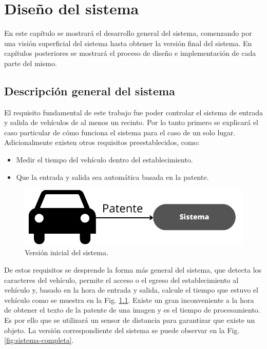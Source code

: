 \chapter{Diseño del sistema}

En este capítulo se mostrará el desarrollo general del sistema, comenzando por una visión superficial del sistema hasta obtener la versión final del sistema. En capítulos posteriores se mostrará el proceso de diseño e implementación de cada parte del mismo.

\section{Descripción general del sistema}

El requisito fundamental de este trabajo fue poder controlar el sistema de entrada y salida de vehículos de al menos un recinto. Por lo tanto primero se explicará el caso particular de cómo funciona el sistema para el caso de un solo lugar. Adicionalmente existen otros requisitos preestablecidos, como:

\begin{itemize}
    \item Medir el tiempo del vehículo dentro del establecimiento.
    \item Que la entrada y salida sea automática basada en la patente.
\end{itemize}

\begin{figure}[bth]
    \centering
    \includegraphics[width=.8\textwidth]{imgs/sistema-base.png}
    \caption{Versión inicial del sistema.}
    \label{fig:sistema-base}
\end{figure}

De estos requisitos se desprende la forma más general del sistema, que detecta los caracteres del vehículo, permite el acceso o el egreso del establecimiento al vehículo y, basado en la hora de entrada y salida, calcule el tiempo que estuvo el vehículo como se muestra en la Fig. \ref{fig:sistema-base}.
Existe un gran inconveniente a la hora de obtener el texto de la patente de una imagen y es el tiempo de procesamiento. Es por ello que se utilizará un sensor de distancia para garantizar que existe un objeto.
La versión correspondiente del sistema se puede observar en la Fig. \ref{fig:sistema-completa}.

